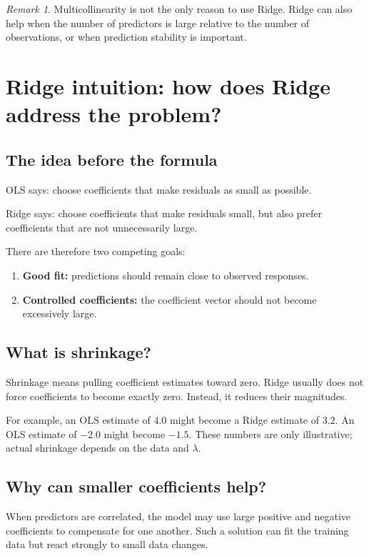 \documentclass[11pt,a4paper,oneside]{book}
\theoremstyle{remark}
\newtheorem{remark}{Remark}[chapter]
\begin{document}
\begin{remark}
Multicollinearity is not the only reason to use Ridge. Ridge can also help
when the number of predictors is large relative to the number of observations,
or when prediction stability is important.
\end{remark}

\chapter{Ridge intuition: how does Ridge address the problem?}

\section{The idea before the formula}
OLS says: choose coefficients that make residuals as small as possible.

Ridge says: choose coefficients that make residuals small, but also prefer
coefficients that are not unnecessarily large.

There are therefore two competing goals:
\begin{enumerate}
\item \textbf{Good fit:} predictions should remain close to observed responses.
\item \textbf{Controlled coefficients:} the coefficient vector should not
become excessively large.
\end{enumerate}

\section{What is shrinkage?}
Shrinkage means pulling coefficient estimates toward zero. Ridge usually
does not force coefficients to become exactly zero. Instead, it reduces
their magnitudes.

For example, an OLS estimate of $4.0$ might become a Ridge estimate of $3.2$.
An OLS estimate of $-2.0$ might become $-1.5$. These numbers are only
illustrative; actual shrinkage depends on the data and $\lambda$.

\section{Why can smaller coefficients help?}
When predictors are correlated, the model may use large positive and negative
coefficients to compensate for one another. Such a solution can fit the
training data but react strongly to small data changes.
\end{document}
